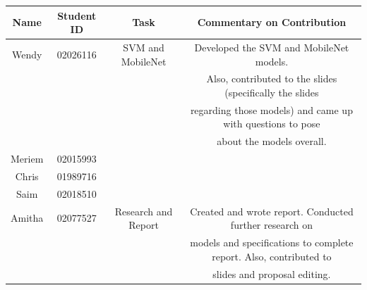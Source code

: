 \documentclass{article}
\theoremstyle{plain}
\theoremstyle{definition}
\theoremstyle{remark}
\begin{document}
\begin{table}[!h]
    \centering
    \begin{tabular}{| c | c | c | c |}
        \hline
        \textbf{Name} & \textbf{Student ID} & \textbf{Task} & \textbf{Commentary on Contribution} \\
        \hline
        Wendy & 02026116 & SVM and MobileNet & Developed the SVM and MobileNet models. \\ 
        & & & Also, contributed to the slides (specifically the slides \\
        & & & regarding those models) and came up with questions to pose \\
        & & & about the models overall. \\
        \hline
        Meriem & 02015993 & & \\
        \hline
        Chris & 01989716 & & \\
        \hline
        Saim & 02018510 & & \\
        \hline
        Amitha & 02077527 & Research and Report & Created and wrote report. Conducted further research on \\ 
        & & & models and specifications to complete report. Also, contributed to \\
        & & & slides and proposal editing. \\
        \hline
    \end{tabular}
\end{table}
\end{document}
